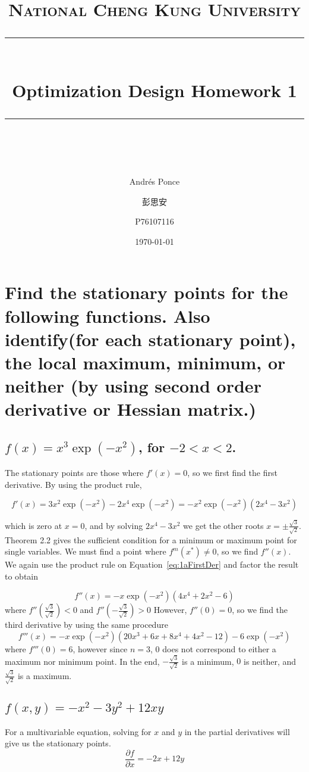 \documentclass[11pt]{scrartcl}
\title{ 
	\normalfont\normalsize
	\textsc{National Cheng Kung University}\\
	\vspace{25pt}
	\rule{\linewidth}{1pt}\\
	\vspace{20pt}
	{\huge Optimization Design Homework 1}\\
	\vspace{12pt}
	\rule{\linewidth}{2pt}\\
	\vspace{12pt}
}
\author{\Large Andr\'es Ponce \and 彭思安 \and P76107116}
\date{\normalsize\today}
\begin{document}
\maketitle
\section{Find the stationary points for the following functions. 
Also identify(for each stationary point), the local maximum, minimum,
or neither (by using second order derivative or Hessian matrix.)}

\subsection{$f(x) = x^{3}\exp(-x^2)$, for $-2<x<2$.}
The stationary points are those where $f'(x) = 0$, so we first find
the first derivative.
By using the product rule,

\begin{equation}
\label{eq:1aFirstDer}
f'(x) = 3x^{2}\exp(-x^{2}) -2x^{4}\exp(-x^{2}) = -x^2 \exp(-x^{2})(2x^4 - 3x^2)
\end{equation}

which is zero at $x=0$, and by solving $2x^4 - 3x^2$ we get the other roots $x=\pm\frac{\sqrt{3}}{\sqrt{2}}$.
Theorem 2.2 gives the sufficient condition for a minimum or maximum point for
single variables.
We must find a point where $f^{m}(x^{*}) \neq 0$, so we find $f''(x)$.
We again use the product rule on Equation~\ref{eq:1aFirstDer} and factor 
the result to obtain

\begin{equation}
	\label{eq:1aSecondDer}
	f''(x) = -x\exp(-x^{2})(4x^4 + 2x^2 -6)
\end{equation}
where $f''(\frac{\sqrt{3}}{\sqrt{2}}) < 0$ and $f''(-\frac{\sqrt{3}}{\sqrt{2}}) > 0$ However, $f''(0) = 0$,
so we find the third derivative by using the same procedure
\begin{equation}
\label{eq:1aThirdDer}
f'''(x) = -x\exp(-x^{2})(20x^3 + 6x + 8x^4 + 4x^2 -12) - 6\exp(-x^2)
\end{equation}
where $f'''(0)=6$, however since $n=3$, $0$ does not correspond to either
a maximum nor minimum point.
In the end, $-\frac{\sqrt{3}}{\sqrt{2}}$ is a minimum, $0$ is neither, and 
$\frac{\sqrt{3}}{\sqrt{2}}$ is a maximum.

\subsection{$f(x, y) = -x^2 -3y^2 + 12xy$}
For a multivariable equation, solving for $x$ and $y$ in the partial derivatives will give us
the stationary points.
\begin{equation}
	\label{eq:1bxFirstDer}
	\frac{\partial f}{\partial x} = -2x + 12y
\end{equation}
\end{document}
